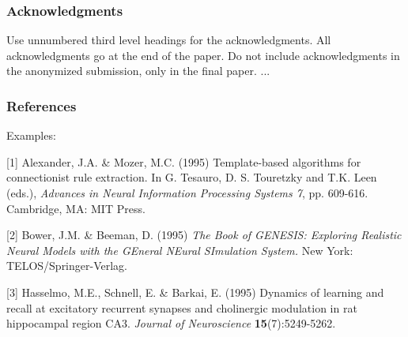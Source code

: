 \documentclass{article} %
\begin{document}
\subsubsection*{Acknowledgments}

Use unnumbered third level headings for the acknowledgments. All
acknowledgments go at the end of the paper. Do not include 
acknowledgments in the anonymized submission, only in the 
final paper. 
...

\subsubsection*{References}
Examples: \\

\small{
[1] Alexander, J.A. \& Mozer, M.C. (1995) Template-based algorithms
for connectionist rule extraction. In G. Tesauro, D. S. Touretzky
and T.K. Leen (eds.), {\it Advances in Neural Information Processing
Systems 7}, pp. 609-616. Cambridge, MA: MIT Press.

[2] Bower, J.M. \& Beeman, D. (1995) {\it The Book of GENESIS: Exploring
Realistic Neural Models with the GEneral NEural SImulation System.}
New York: TELOS/Springer-Verlag.

[3] Hasselmo, M.E., Schnell, E. \& Barkai, E. (1995) Dynamics of learning
and recall at excitatory recurrent synapses and cholinergic modulation
in rat hippocampal region CA3. {\it Journal of Neuroscience}
{\bf 15}(7):5249-5262.
}
\end{document}
